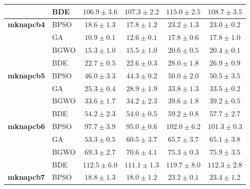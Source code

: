 \begin{table}[htbp]
\begin{tabular*}{\textwidth}{@{\extracolsep{\fill}}llcccc@{}}
                       & BDE   & $\mathbf{106.9 \pm 3.6}$ &          $107.3 \pm 2.2$ &          $115.0 \pm 2.5$ &          $108.7 \pm 3.5$ \\
    \midrule
    \textbf{mknapcb4}  & BPSO  &           $18.6 \pm 1.3$ &  $\mathbf{17.8 \pm 1.2}$ &           $23.2 \pm 1.3$ &           $23.0 \pm 0.2$ \\
                       & GA    &  $\mathbf{10.9 \pm 0.1}$ &           $12.6 \pm 0.1$ &           $17.8 \pm 0.6$ &           $17.8 \pm 1.0$ \\
                       & BGWO  &  $\mathbf{15.3 \pm 1.0}$ &           $15.5 \pm 1.0$ &           $20.6 \pm 0.5$ &           $20.4 \pm 0.1$ \\
                       & BDE   &           $22.7 \pm 0.5$ &  $\mathbf{22.6 \pm 0.3}$ &           $28.0 \pm 1.8$ &           $26.9 \pm 0.9$ \\
    \midrule
    \textbf{mknapcb5}  & BPSO  &           $46.0 \pm 3.3$ &  $\mathbf{44.3 \pm 0.2}$ &           $50.0 \pm 2.0$ &           $50.5 \pm 3.5$ \\
                       & GA    &  $\mathbf{25.3 \pm 0.4}$ &           $28.9 \pm 1.9$ &           $33.8 \pm 1.3$ &           $33.5 \pm 0.2$ \\
                       & BGWO  &  $\mathbf{33.6 \pm 1.7}$ &           $34.2 \pm 2.3$ &           $39.6 \pm 1.8$ &           $39.2 \pm 0.5$ \\
                       & BDE   &           $54.2 \pm 2.3$ &  $\mathbf{54.0 \pm 0.5}$ &           $59.2 \pm 0.8$ &           $57.7 \pm 2.7$ \\
    \midrule
    \textbf{mknapcb6}  & BPSO  &           $97.7 \pm 3.9$ &  $\mathbf{95.0 \pm 0.6}$ &          $102.0 \pm 6.2$ &          $101.3 \pm 0.3$ \\
                       & GA    &  $\mathbf{53.3 \pm 0.5}$ &           $60.5 \pm 3.7$ &           $65.7 \pm 3.7$ &           $65.1 \pm 3.8$ \\
                       & BGWO  &  $\mathbf{69.3 \pm 2.7}$ &           $70.6 \pm 4.1$ &           $75.3 \pm 0.3$ &           $75.9 \pm 3.5$ \\
                       & BDE   &          $112.5 \pm 6.0$ & $\mathbf{111.1 \pm 1.3}$ &          $119.7 \pm 8.0$ &          $112.3 \pm 2.8$ \\
    \midrule
    \textbf{mknapcb7}  & BPSO  &           $18.8 \pm 1.3$ &  $\mathbf{18.0 \pm 1.2}$ &           $23.2 \pm 0.1$ &           $23.4 \pm 1.2$ \\

\end{tabular*}
\end{table}
